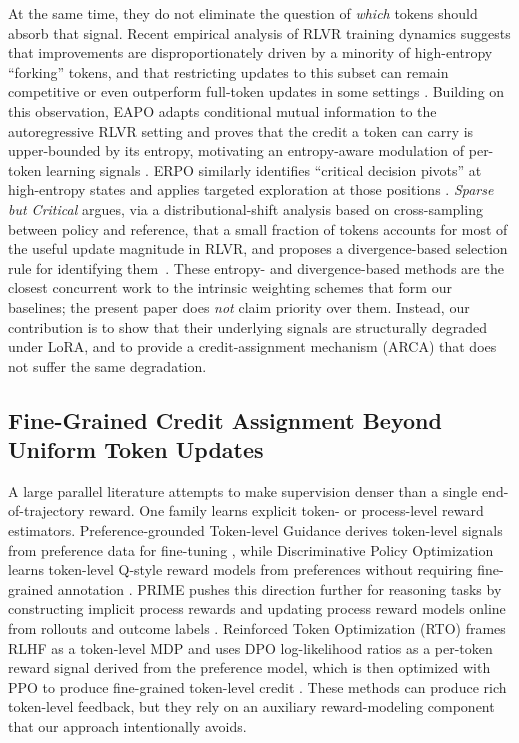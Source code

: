 At the same time, they do not eliminate the question of \emph{which} tokens should
absorb that signal. Recent empirical analysis of RLVR training dynamics suggests that
improvements are disproportionately driven by a minority of high-entropy ``forking''
tokens, and that restricting updates to this subset can remain competitive or even
outperform full-token updates in some settings \cite{wang2025beyond8020}. Building on
this observation, EAPO adapts conditional mutual information to the autoregressive RLVR
setting and proves that the credit a token can carry is upper-bounded by its entropy,
motivating an entropy-aware modulation of per-token learning signals
\cite{he2026eapo}. ERPO similarly identifies ``critical decision pivots'' at
high-entropy states and applies targeted exploration at those positions
\cite{yu2026erpo}. \emph{Sparse but Critical} argues, via a distributional-shift analysis based on
cross-sampling between policy and reference, that a small fraction of tokens
accounts for most of the useful update magnitude in RLVR, and proposes a
divergence-based selection rule for identifying them~\cite{meng2026sparsebutcritical}. These entropy- and divergence-based
methods are the closest concurrent work to the intrinsic weighting schemes that form
our baselines; the present paper does \emph{not} claim priority over them. Instead,
our contribution is to show that their underlying signals are structurally degraded
under LoRA, and to provide a credit-assignment mechanism (ARCA) that does not suffer
the same degradation.

\subsection{Fine-Grained Credit Assignment Beyond Uniform Token Updates}

A large parallel literature attempts to make supervision denser than a single
end-of-trajectory reward. One family learns explicit token- or process-level reward
estimators. Preference-grounded Token-level Guidance derives token-level signals from
preference data for fine-tuning \cite{yang2023pgtg}, while Discriminative Policy
Optimization learns token-level Q-style reward models from preferences without
requiring fine-grained annotation \cite{chen2025dpoqrm}. PRIME pushes this direction
further for reasoning tasks by constructing implicit process rewards and updating
process reward models online from rollouts and outcome labels \cite{cui2025prime}.
Reinforced Token Optimization (RTO) frames RLHF as a token-level MDP and uses DPO
log-likelihood ratios as a per-token reward signal derived from the preference
model, which is then optimized with PPO to produce fine-grained token-level
credit \cite{zhong2025rto}. These methods can produce rich
token-level feedback, but they rely on an auxiliary reward-modeling component that our
approach intentionally avoids.

